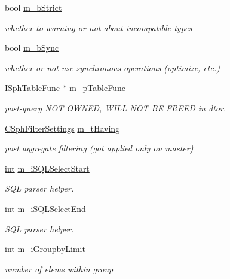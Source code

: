 \begin{DoxyCompactItemize}
bool \hyperlink{classCSphQuery_a30bb3c386034e7a14c6599439d378d19}{m\-\_\-b\-Strict}
\begin{DoxyCompactList}\small\item\em whether to warning or not about incompatible types \end{DoxyCompactList}\item 
bool \hyperlink{classCSphQuery_a7e09b2bec22311e40299abc8220e794f}{m\-\_\-b\-Sync}
\begin{DoxyCompactList}\small\item\em whether or not use synchronous operations (optimize, etc.) \end{DoxyCompactList}\item 
\hyperlink{classISphTableFunc}{I\-Sph\-Table\-Func} $\ast$ \hyperlink{classCSphQuery_ac1cbf2083d8fb68cf7643182660639af}{m\-\_\-p\-Table\-Func}
\begin{DoxyCompactList}\small\item\em post-\/query N\-O\-T O\-W\-N\-E\-D, W\-I\-L\-L N\-O\-T B\-E F\-R\-E\-E\-D in dtor. \end{DoxyCompactList}\item 
\hyperlink{classCSphFilterSettings}{C\-Sph\-Filter\-Settings} \hyperlink{classCSphQuery_ad2f3489882b02218dd9924fe21ad767b}{m\-\_\-t\-Having}
\begin{DoxyCompactList}\small\item\em post aggregate filtering (got applied only on master) \end{DoxyCompactList}\item 
\hyperlink{sphinxexpr_8cpp_a4a26e8f9cb8b736e0c4cbf4d16de985e}{int} \hyperlink{classCSphQuery_a64b893fbd1975d6ebce6bf7baa8471fa}{m\-\_\-i\-S\-Q\-L\-Select\-Start}
\begin{DoxyCompactList}\small\item\em S\-Q\-L parser helper. \end{DoxyCompactList}\item 
\hyperlink{sphinxexpr_8cpp_a4a26e8f9cb8b736e0c4cbf4d16de985e}{int} \hyperlink{classCSphQuery_a61f3b213ff219c4fdd8fd548a4401790}{m\-\_\-i\-S\-Q\-L\-Select\-End}
\begin{DoxyCompactList}\small\item\em S\-Q\-L parser helper. \end{DoxyCompactList}\item 
\hyperlink{sphinxexpr_8cpp_a4a26e8f9cb8b736e0c4cbf4d16de985e}{int} \hyperlink{classCSphQuery_abdb3ca6adb1e4816a1704b6b7f5f096a}{m\-\_\-i\-Groupby\-Limit}
\begin{DoxyCompactList}\small\item\em number of elems within group \end{DoxyCompactList}\item 

\end{DoxyCompactItemize}
